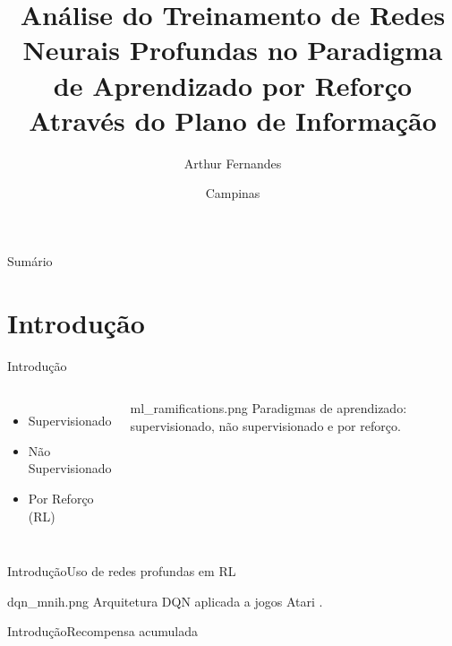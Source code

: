 \documentclass[
11pt,notheorems,hyperref={pdfauthor=Autor}
]{beamer}
\title{Análise do Treinamento de Redes Neurais Profundas no Paradigma de Aprendizado por Reforço Através do Plano de Informação}
\author{Arthur Fernandes}
\institute{UNIVERSIDADE ESTADUAL DE CAMPINAS}
\date{Campinas \the\year}
\begin{document}
\begin{frame}[plain]
    \maketitle
\end{frame}

\begin{frame}[plain]{Sumário}
    \tableofcontents
\end{frame}

\section{Introdução}
\begin{frame}{Introdução}

\begin{columns}[T,onlytextwidth]
    \begin{itemize}
        \item Supervisionado \pause
        \item Não Supervisionado \pause
        \item Por Reforço (RL) 
    \end{itemize}
    \pause

    \centering
    \FigureWithFallbackCaption
    {ml_ramifications.png}
    {Paradigmas de aprendizado: supervisionado, não supervisionado e por reforço.}

\end{columns}
\end{frame}

\begin{frame}{Introdução}{Uso de redes profundas em RL~\textcite{mnih_human-level_2015}}
    \pause
    \centering
    \begin{minipage}{0.8\textwidth}
        \FigureWithFallbackCaption
        {dqn_mnih.png}
        {Arquitetura DQN aplicada a jogos Atari \parencite{mnih_human-level_2015}.}
    \end{minipage}
\end{frame}

\begin{frame}{Introdução}{Recompensa acumulada}
    \pause
    \begin{minipage}{\textwidth}
        \centering
    \end{minipage}
\end{frame}
\end{document}
